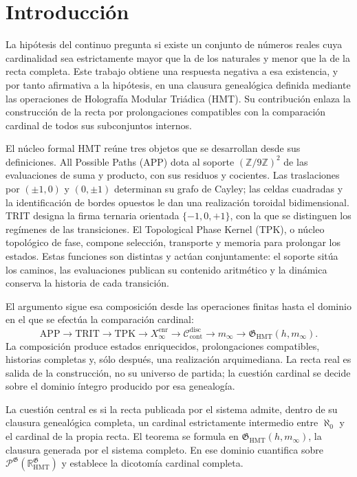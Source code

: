 \section{Introducción}
\label{sec:introduccion-ch}

La hipótesis del continuo pregunta si existe un conjunto de números reales
cuya cardinalidad sea estrictamente mayor que la de los naturales y menor que
la de la recta completa. Este trabajo obtiene una respuesta negativa a esa
existencia, y por tanto afirmativa a la hipótesis, en una clausura genealógica
definida mediante las operaciones de Holografía Modular Triádica (HMT).
Su contribución enlaza la construcción de la recta por prolongaciones
compatibles con la comparación cardinal de todos sus subconjuntos internos.

El núcleo formal HMT reúne tres objetos que se desarrollan desde sus
definiciones. All Possible Paths (APP) dota al soporte
\((\mathbb Z/9\mathbb Z)^2\) de las evaluaciones de suma y producto, con sus
residuos y cocientes. Las traslaciones por \((\pm1,0)\) y \((0,\pm1)\)
determinan su grafo de Cayley; las celdas cuadradas y la identificación de
bordes opuestos le dan una realización toroidal bidimensional. TRIT designa
la firma ternaria orientada \(\{-1,0,+1\}\), con la que se distinguen los
regímenes de las transiciones. El Topological Phase Kernel (TPK), o núcleo
topológico de fase, compone selección, transporte y memoria para prolongar
los estados. Estas funciones son distintas y actúan conjuntamente: el soporte
sitúa los caminos, las evaluaciones publican su contenido aritmético y la
dinámica conserva la historia de cada transición.

El argumento sigue esa composición desde las operaciones finitas hasta el
dominio en el que se efectúa la comparación cardinal:
\[
 \mathrm{APP}\longrightarrow\mathrm{TRIT}\longrightarrow\mathrm{TPK}
 \longrightarrow X_\infty^{\mathrm{enr}}
 \longrightarrow\mathcal C_{\mathrm{cont}}^{\mathrm{disc}}
 \longrightarrow m_\infty
 \longrightarrow\mathfrak G_{\mathrm{HMT}}(h,m_\infty).
\]
La composición produce estados enriquecidos, prolongaciones compatibles,
historias completas y, sólo después, una realización arquimediana. La recta
real es salida de la construcción, no su universo de partida; la cuestión
cardinal se decide sobre el dominio íntegro producido por esa genealogía.

La cuestión central es si la recta publicada por el sistema admite, dentro de
su clausura genealógica completa, un cardinal estrictamente intermedio entre
\(\aleph_0\) y el cardinal de la propia recta. El teorema se formula en
\(\mathfrak G_{\mathrm{HMT}}(h,m_\infty)\), la clausura generada por el sistema
completo. En ese dominio cuantifica sobre
\(\mathcal P^{\mathfrak G}(\mathbb R_{\mathrm{HMT}}^{\mathfrak G})\) y
establece la dicotomía cardinal completa.

